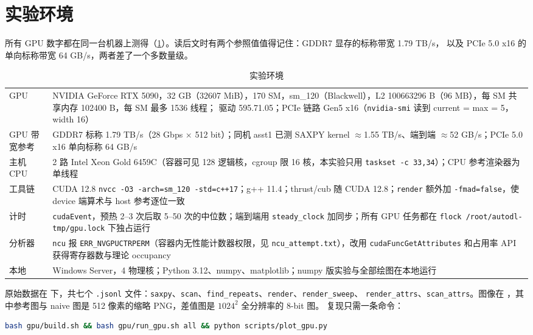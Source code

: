 \documentclass[11pt,a4paper]{ctexart}
\begin{document}
\section{实验环境}

所有 GPU 数字都在同一台机器上测得（\cref{tab:env}）。读后文时有两个参照值值得记住：GDDR7 显存的标称带宽 1.79 TB/s，
以及 PCIe 5.0 x16 的单向标称带宽 64 GB/s，两者差了一个多数量级。

\begin{table}[H]
\centering\small
\caption{实验环境}\label{tab:env}
\begin{tabularx}{\linewidth}{lX}
\toprule
GPU & NVIDIA GeForce RTX 5090，32 GB（32607 MiB），170 SM，sm\_120（Blackwell），L2 100663296 B（96 MB），每 SM 共享内存 102400 B，每 SM 最多 1536 线程；
驱动 595.71.05；PCIe 链路 Gen5 x16（\texttt{nvidia-smi} 读到 current = max = 5，width 16）\\
GPU 带宽参考 & GDDR7 标称 1.79 TB/s（28 Gbps $\times$ 512 bit）；同机 asst1 已测 SAXPY kernel $\approx$1.55 TB/s、端到端 $\approx$52 GB/s；PCIe 5.0 x16 单向标称 64 GB/s\\
主机 CPU & 2 路 Intel Xeon Gold 6459C（容器可见 128 逻辑核，cgroup 限 16 核，本实验只用 \texttt{taskset -c 33,34}）；CPU 参考渲染器为单线程\\
工具链 & CUDA 12.8 \texttt{nvcc -O3 -arch=sm\_120 -std=c++17}；g++ 11.4；thrust/cub 随 CUDA 12.8；\texttt{render} 额外加 \texttt{-fmad=false}，使 device 端算术与 host 参考逐位一致\\
计时 & \texttt{cudaEvent}，预热 2--3 次后取 5--50 次的中位数；端到端用 \texttt{steady\_clock} 加同步；所有 GPU 任务都在 \texttt{flock /root/autodl-tmp/gpu.lock} 下独占运行\\
分析器 & \texttt{ncu} 报 \texttt{ERR\_NVGPUCTRPERM}（容器内无性能计数器权限，见 \texttt{ncu\_attempt.txt}），改用 \texttt{cudaFuncGetAttributes} 和占用率 API 获得寄存器数与理论 occupancy\\
本地 & Windows Server，4 物理核；Python 3.12、numpy、matplotlib；numpy 版实验与全部绘图在本地运行\\
\bottomrule
\end{tabularx}
\end{table}

原始数据在  下，共七个 \texttt{.jsonl} 文件：\texttt{saxpy}、\texttt{scan}、\texttt{find\_repeats}、\texttt{render}、\texttt{render\_sweep}、
\texttt{render\_attrs}、\texttt{scan\_attrs}。图像在 ，其中参考图与 naive 图是 512 像素的缩略 PNG，差值图是 $1024^2$ 全分辨率的 8-bit 图。
复现只需一条命令：
\begin{lstlisting}[language=bash,numbers=none]
bash gpu/build.sh && bash gpu/run_gpu.sh all && python scripts/plot_gpu.py
\end{lstlisting}
\end{document}
